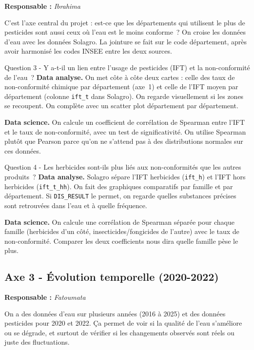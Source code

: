 \documentclass[a4paper,11pt]{article}
\begin{document}
\textbf{Responsable :} {\itshape Ibrahima}

C'est l'axe central du projet : est-ce que les départements qui utilisent le plus de pesticides sont aussi ceux où l'eau est le moins conforme~? On croise les données d'eau avec les données Solagro. La jointure se fait sur le code département, après avoir harmonisé les codes INSEE entre les deux sources.

\begin{questionbox}{Question 3 - Y a-t-il un lien entre l'usage de pesticides (IFT) et la non-conformité de l'eau~?}
\textbf{Data analyse.} On met côte à côte deux cartes : celle des taux de non-conformité chimique par département (axe~1) et celle de l'IFT moyen par département (colonne \texttt{ift\_t} dans Solagro). On regarde visuellement si les zones se recoupent. On complète avec un scatter plot département par département.\par\smallskip
\textbf{Data science.} On calcule un coefficient de corrélation de Spearman entre l'IFT et le taux de non-conformité, avec un test de significativité. On utilise Spearman plutôt que Pearson parce qu'on ne s'attend pas à des distributions normales sur ces données.
\end{questionbox}

\begin{questionbox}{Question 4 - Les herbicides sont-ils plus liés aux non-conformités que les autres produits~?}
\textbf{Data analyse.} Solagro sépare l'IFT herbicides (\texttt{ift\_h}) et l'IFT hors herbicides (\texttt{ift\_t\_hh}). On fait des graphiques comparatifs par famille et par département. Si \texttt{DIS\_RESULT} le permet, on regarde quelles substances précises sont retrouvées dans l'eau et à quelle fréquence.\par\smallskip
\textbf{Data science.} On calcule une corrélation de Spearman séparée pour chaque famille (herbicides d'un côté, insecticides/fongicides de l'autre) avec le taux de non-conformité. Comparer les deux coefficients nous dira quelle famille pèse le plus.
\end{questionbox}

\subsection{Axe 3 - Évolution temporelle (2020-2022)}

\textbf{Responsable :} {\itshape Fatoumata}

On a des données d'eau sur plusieurs années (2016 à 2025) et des données pesticides pour 2020 et 2022. Ça permet de voir si la qualité de l'eau s'améliore ou se dégrade, et surtout de vérifier si les changements observés sont réels ou juste des fluctuations.
\end{document}
